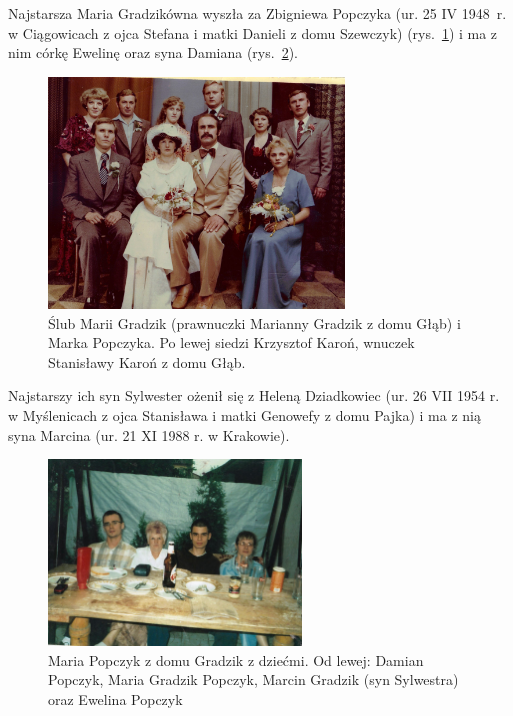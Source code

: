 Najstarsza Maria Gradzikówna wyszła za Zbigniewa Popczyka (ur. 25 IV 1948~r. w Ciągowicach z ojca Stefana i matki Danieli z domu Szewczyk) (rys.~\ref{rys:slub_marii_gradzik_i_marka_popczyka}) i ma z nim córkę Ewelinę oraz syna Damiana (rys.~\ref{rys:damian_maria_ewelina_popczykowie_marcin_gradzik}).

\begin{figure}[!h]
\begin{center}
\includegraphics[width=0.7\textwidth]{zdjecia/slub_marii_gradzik_i_marka_popczyka.jpg}
\caption[Ślub Marii Gradzik i Marka Popczyka]{Ślub Marii Gradzik (prawnuczki Marianny Gradzik z domu Głąb) i Marka Popczyka. Po lewej siedzi Krzysztof Karoń, wnuczek Stanisławy Karoń z domu Głąb.}
\label{rys:slub_marii_gradzik_i_marka_popczyka}
\end{center}
\end{figure}

Najstarszy ich syn Sylwester ożenił się z Heleną Dziadkowiec (ur. 26 VII 1954 r. w Myślenicach z ojca Stanisława i matki Genowefy z domu Pajka) i ma z nią syna Marcina (ur. 21 XI 1988 r. w Krakowie).

\begin{figure}[!h]
\begin{center}
\includegraphics[width=0.6\textwidth]{zdjecia/damian_maria_ewelina_popczykowie_marcin_gradzik.jpg}
\caption[Maria Popczyk z dziećmi]{Maria Popczyk z domu Gradzik z dziećmi. Od lewej: Damian Popczyk, Maria Gradzik Popczyk, Marcin Gradzik (syn Sylwestra) oraz Ewelina Popczyk}
\label{rys:damian_maria_ewelina_popczykowie_marcin_gradzik}
\end{center}
\end{figure}

